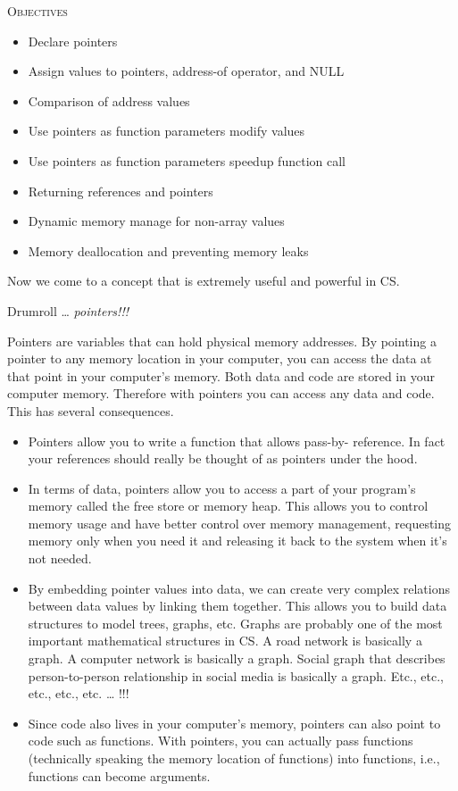 \newpage{}

\textsc{Objectives}

\begin{itemize}
\tightlist
\item
  Declare pointers
\item
  Assign values to pointers, address-of operator, and NULL
\item
  Comparison of address values
\item
  Use pointers as function parameters modify values
\item
  Use pointers as function parameters speedup function call
\item
  Returning references and pointers
\item
  Dynamic memory manage for non-array values
\item
  Memory deallocation and preventing memory leaks
\end{itemize}

Now we come to a concept that is extremely useful and powerful in CS.

Drumroll \ldots{} \emph{pointers!!!}

Pointers are variables that can hold physical memory addresses. By pointing a pointer to any memory location in your computer, you can access the data at that point in your computer's memory. Both data and code are stored in your computer memory. Therefore with pointers you can access any data and code. This has several consequences.

\begin{itemize}
\item
  Pointers allow you to write a function that allows pass-by- reference.
  In fact your references should really be thought of as pointers under
  the hood.
\item
  In terms of data, pointers allow you to access a part of your
  program's memory called the free store or memory heap. This allows you
  to control memory usage and have better control over memory
  management, requesting memory only when you need it and releasing it
  back to the system when it's not needed.
\item
  By embedding pointer values into data, we can create very complex
  relations between data values by linking them together. This allows
  you to build data structures to model trees, graphs, etc. Graphs are
  probably one of the most important mathematical structures in CS. A
  road network is basically a graph. A computer network is basically a
  graph. Social graph that describes person-to-person relationship in
  social media is basically a graph. Etc., etc., etc., etc., etc.
  \ldots{} !!!
\item
  Since code also lives in your computer's memory, pointers can also
  point to code such as functions. With pointers, you can actually pass
  functions (technically speaking the memory location of functions) into
  functions, i.e., functions can become arguments.
\end{itemize}

